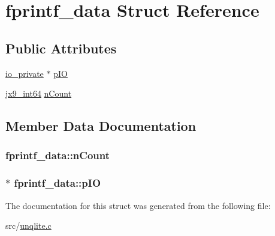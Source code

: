 \hypertarget{structfprintf__data}{\section{fprintf\-\_\-data Struct Reference}
\label{d6/dfc/structfprintf__data}
}
\subsection*{Public Attributes}
\begin{DoxyCompactItemize}
\item 
\hyperlink{structio__private}{io\-\_\-private} $\ast$ \hyperlink{structfprintf__data_a70fb0cb9380fc54f7fbd3c6f90274c89}{p\-I\-O}
\item 
\hyperlink{unqlite_8c_aeaac5ecf324354b1c4bb9f6559bab7af}{jx9\-\_\-int64} \hyperlink{structfprintf__data_a7627a95abf7b6e7cf992bebf06f45239}{n\-Count}
\end{DoxyCompactItemize}


\subsection{Member Data Documentation}
\hypertarget{structfprintf__data_a7627a95abf7b6e7cf992bebf06f45239}{
\subsubsection[{n\-Count}]{ fprintf\-\_\-data\-::n\-Count}}\label{d6/dfc/structfprintf__data_a7627a95abf7b6e7cf992bebf06f45239}
\hypertarget{structfprintf__data_a70fb0cb9380fc54f7fbd3c6f90274c89}{
\subsubsection[{p\-I\-O}]{$\ast$ fprintf\-\_\-data\-::p\-I\-O}}\label{d6/dfc/structfprintf__data_a70fb0cb9380fc54f7fbd3c6f90274c89}


The documentation for this struct was generated from the following file\-:\begin{DoxyCompactItemize}
\item 
src/\hyperlink{unqlite_8c}{unqlite.\-c}\end{DoxyCompactItemize}
